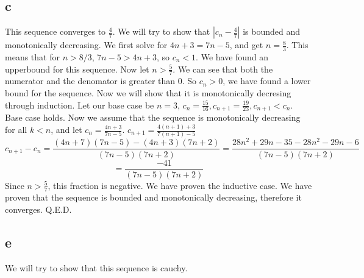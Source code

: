 \documentclass[12pt]{article}
\begin{document}
\subsection{c}
This sequence converges to $\frac{4}{7}$. We will try to show that $|c_n-\frac{4}{7}|$ is bounded and monotonically decreasing.
\newline
We first solve for $4n+3 = 7n-5$, and get $n = \frac{8}{3}$. This means that for $n > 8/3$, $7n-5 > 4n+3$, so $c_n < 1$. We have found an upperbound for this sequence.
\newline
Now let $n > \frac{5}{7}$. We can see that both the numerator and the denomator is greater than 0. So $c_n > 0$, we have found a lower bound for the sequence.
\newline
Now we will show that it is monotonically decresing through induction. Let our base case be $n = 3$, $c_n = \frac{15}{16}, c_{n+1} = \frac{19}{23}, c_{n+1} < c_n$. Base case holds.
\newline
Now we assume that the sequence is monotonically decreasing for all $k < n$, and let $c_n = \frac{4n+3}{7n-5}$. $c_{n+1} = \frac{4(n+1)+3}{7(n+1)-5}$
$$c_{n+1} - c_n = \frac{(4n+7)(7n-5)-(4n+3)(7n+2)}{(7n-5)(7n+2)} = \frac{28n^2+29n-35-28n^2-29n-6}{(7n-5)(7n+2)}$$ $$= \frac{-41}{(7n-5)(7n+2)}$$
Since $n > \frac{5}{7}$, this fraction is negative. We have proven the inductive case.
\newline
We have proven that the sequence is bounded and monotonically decreasing, therefore it converges. Q.E.D.


\subsection{e}
We will try to show that this sequence is cauchy.
\end{document}
